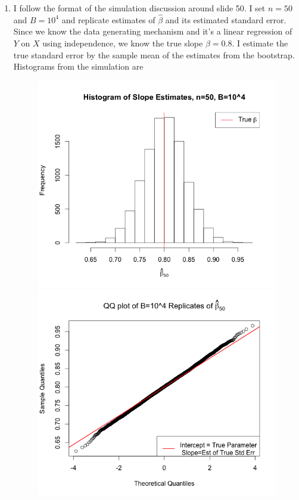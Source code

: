 \documentclass[11pt]{article}
\begin{document}
\begin{enumerate}
	\item I follow the format of the simulation discussion around slide 50. I set $n=50$ and $B=10^4$ and replicate estimates of $\widehat\beta$ and its estimated standard error. Since we know the data generating mechanism and it's a linear regression of $Y$ on $X$ using independence, we know the true slope $\beta=0.8$. I estimate the true standard error by the sample mean of the estimates from the bootstrap. Histograms from the simulation are  
		\begin{figure}[H]
			\includegraphics[scale=0.4]{Rplotp21}
			\includegraphics[scale=0.4]{Rplotp22}			
		\end{figure}
		

\end{enumerate}
\end{document}
